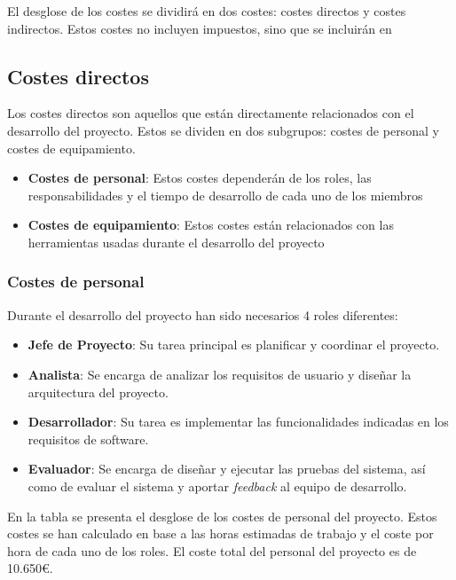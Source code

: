El desglose de los costes se dividirá en dos costes: costes directos y costes indirectos. Estos costes no incluyen impuestos, sino que se incluirán en 

\subsection{Costes directos}\label{subsec:costes_directos}

Los costes directos son aquellos que están directamente relacionados con el desarrollo del proyecto. Estos se dividen en dos subgrupos: costes de personal y costes de equipamiento.
\begin{itemize}
    \item \textbf{Costes de personal}: Estos costes dependerán de los roles, las responsabilidades y el tiempo de desarrollo de cada uno de los miembros
    \item \textbf{Costes de equipamiento}: Estos costes están relacionados con las herramientas usadas durante el desarrollo del proyecto
\end{itemize}

\subsubsection{Costes de personal}
Durante el desarrollo del proyecto han sido necesarios 4 roles diferentes:
\begin{itemize}
    \item \textbf{Jefe de Proyecto}: Su tarea principal es planificar y coordinar el proyecto.
    \item \textbf{Analista}: Se encarga de analizar los requisitos de usuario y diseñar la arquitectura del proyecto.
    \item \textbf{Desarrollador}: Su tarea es implementar las funcionalidades indicadas en los requisitos de software.
    \item \textbf{Evaluador}: Se encarga de diseñar y ejecutar las pruebas del sistema, así como de evaluar el sistema y aportar \textit{feedback} al equipo de desarrollo.
\end{itemize}

En la tabla  se presenta el desglose de los costes de personal del proyecto. Estos costes se han calculado en base a las horas estimadas de trabajo y el coste por hora de cada uno de los roles. El coste total del personal del proyecto es de 10.650\euro.

